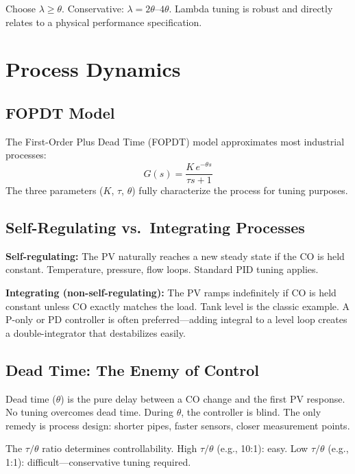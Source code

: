 \documentclass[12pt,twoside,openright]{memoir}
\begin{document}
Choose $\lambda \geq \theta$. Conservative: $\lambda = 2\theta$--$4\theta$. Lambda tuning is robust and directly relates to a physical performance specification.

\chapter{Process Dynamics}

\section{FOPDT Model}

The First-Order Plus Dead Time (FOPDT) model approximates most industrial processes:
\[
G(s) = \frac{K \, e^{-\theta s}}{\tau s + 1}
\]
The three parameters ($K$, $\tau$, $\theta$) fully characterize the process for tuning purposes.

\section{Self-Regulating vs.\ Integrating Processes}

\textbf{Self-regulating:} The PV naturally reaches a new steady state if the CO is held constant. Temperature, pressure, flow loops. Standard PID tuning applies.

\textbf{Integrating (non-self-regulating):} The PV ramps indefinitely if CO is held constant unless CO exactly matches the load. Tank level is the classic example. A P-only or PD controller is often preferred---adding integral to a level loop creates a double-integrator that destabilizes easily.

\section{Dead Time: The Enemy of Control}

Dead time ($\theta$) is the pure delay between a CO change and the first PV response. No tuning overcomes dead time. During $\theta$, the controller is blind. The only remedy is process design: shorter pipes, faster sensors, closer measurement points.

The $\tau/\theta$ ratio determines controllability. High $\tau/\theta$ (e.g., 10:1): easy. Low $\tau/\theta$ (e.g., 1:1): difficult---conservative tuning required.

\end{document}
